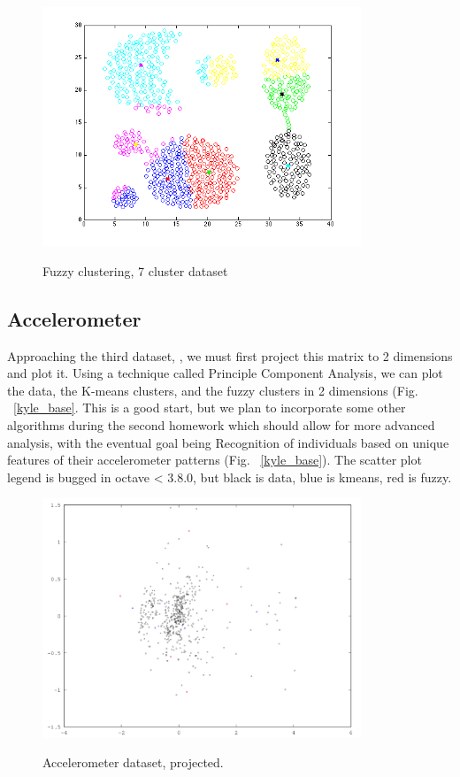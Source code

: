 \documentclass{article}
\begin{document}
\begin{figure}[h!]
  \caption{Fuzzy clustering, 7 cluster dataset}
  \centering
    \includegraphics[width=0.85\textwidth]{fez_7clust_fuzzy.png}
  \label{fig:fez_7clust_fuzzy}
\end{figure}

\subsection*{Accelerometer}
Approaching the third dataset, \cite{Kaggle}, we must first project this matrix to 2 dimensions and plot it.
Using a technique called Principle Component Analysis, we can plot the data, the K-means clusters, and the 
fuzzy clusters in 2 dimensions (Fig. ~\ref{kyle_base}. This is a good start, but we plan to incorporate some other algorithms
during the second homework which should allow for more advanced analysis, with the eventual goal being Recognition
of individuals based on unique features of their accelerometer patterns (Fig. ~\ref{kyle_base}). The scatter plot legend is bugged
in octave < 3.8.0, but black is data, blue is kmeans, red is fuzzy.

\begin{figure}[h!]
  \caption{Accelerometer dataset, projected.}
  \centering
    \includegraphics[width=0.85\textwidth]{kyle_base.png}
  \label{fig:kyle_base}
\end{figure}
\end{document}
